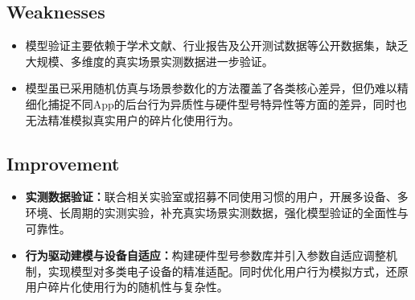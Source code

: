 \documentclass{mcmthesis}  %
\begin{document}
	\subsection{Weaknesses}
	
	\begin{itemize}
		\item 模型验证主要依赖于学术文献、行业报告及公开测试数据等公开数据集，缺乏大规模、多维度的真实场景实测数据进一步验证。
		\item 模型虽已采用随机仿真与场景参数化的方法覆盖了各类核心差异，但仍难以精细化捕捉不同App的后台行为异质性与硬件型号特异性等方面的差异，同时也无法精准模拟真实用户的碎片化使用行为。
	\end{itemize}
	
	
	\subsection{Improvement}
	
	\begin{itemize}
		\item \textbf{实测数据验证：}联合相关实验室或招募不同使用习惯的用户，开展多设备、多环境、长周期的实测实验，补充真实场景实测数据，强化模型验证的全面性与可靠性。
		\item \textbf{行为驱动建模与设备自适应：}构建硬件型号参数库并引入参数自适应调整机制，实现模型对多类电子设备的精准适配。同时优化用户行为模拟方式，还原用户碎片化使用行为的随机性与复杂性。
	\end{itemize}
	
	
	
	
	
\end{document}
